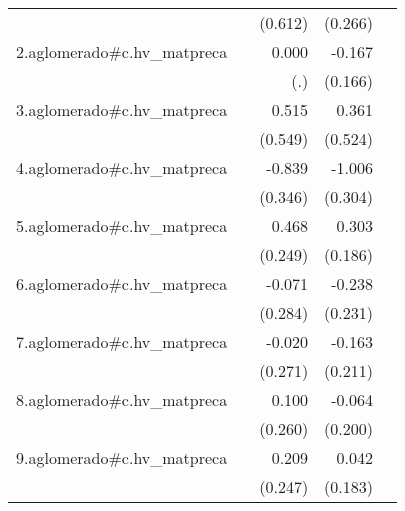 {\begin{longtable}{l*{4}{D{.}{.}{-1}}}
            &                     &     (0.612)         &     (0.266)         &                     \\
\addlinespace
2.aglomerado#c.hv\_matpreca&                     &       0.000         &      -0.167         &                     \\
            &                     &         (.)         &     (0.166)         &                     \\
\addlinespace
3.aglomerado#c.hv\_matpreca&                     &       0.515         &       0.361         &                     \\
            &                     &     (0.549)         &     (0.524)         &                     \\
\addlinespace
4.aglomerado#c.hv\_matpreca&                     &      -0.839\sym{*}  &      -1.006\sym{***}&                     \\
            &                     &     (0.346)         &     (0.304)         &                     \\
\addlinespace
5.aglomerado#c.hv\_matpreca&                     &       0.468         &       0.303         &                     \\
            &                     &     (0.249)         &     (0.186)         &                     \\
\addlinespace
6.aglomerado#c.hv\_matpreca&                     &      -0.071         &      -0.238         &                     \\
            &                     &     (0.284)         &     (0.231)         &                     \\
\addlinespace
7.aglomerado#c.hv\_matpreca&                     &      -0.020         &      -0.163         &                     \\
            &                     &     (0.271)         &     (0.211)         &                     \\
\addlinespace
8.aglomerado#c.hv\_matpreca&                     &       0.100         &      -0.064         &                     \\
            &                     &     (0.260)         &     (0.200)         &                     \\
\addlinespace
9.aglomerado#c.hv\_matpreca&                     &       0.209         &       0.042         &                     \\
            &                     &     (0.247)         &     (0.183)         &                     \\

\end{longtable}}
